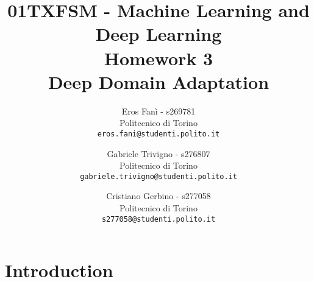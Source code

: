 \documentclass[10pt,twocolumn,hidelinks,letterpaper]{article}
\begin{document}
\title{01TXFSM - Machine Learning and Deep Learning \\
\vspace{0.3in}
Homework 3 \\
Deep Domain Adaptation}

\author{Eros Fanì - s269781\\
Politecnico di Torino\\
{\tt\small eros.fani@studenti.polito.it}
\and
Gabriele Trivigno - s276807\\
Politecnico di Torino\\
{\tt\small gabriele.trivigno@studenti.polito.it}
\and
Cristiano Gerbino - s277058\\
Politecnico di Torino\\
{\tt\small s277058@studenti.polito.it}
}

\maketitle


\newcommand{\quotes}[1]{“#1”}
\newcommand{\reff}[1]{Figure \ref{#1}}
\setlength{\parindent}{0pt}
\setlength{\parskip}{1em}

\begin{abstract}

\end{abstract}

\section{Introduction}


{\small


}
\end{document}
